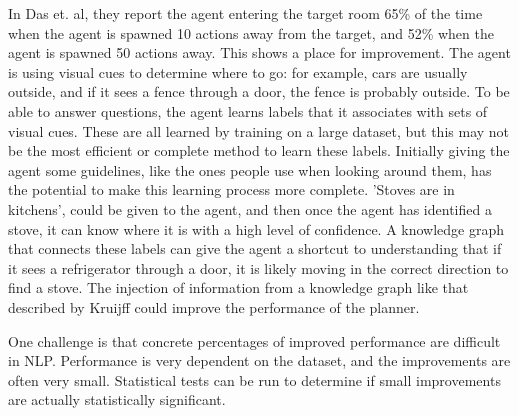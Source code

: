 \documentclass{article}
\begin{document}
In Das et. al, they report the agent entering the target room 65\% of the time when the agent is spawned 10 actions away from the target, and 52\% when the agent is spawned 50 actions away\cite{embodiedqa}. This shows a place for improvement. The agent is using visual cues to determine where to go: for example, cars are usually outside, and if it sees a fence through a door, the fence is probably outside. To be able to answer questions, the agent learns labels that it associates with sets of visual cues. These are all learned by training on a large dataset, but this may not be the most efficient or complete method to learn these labels. Initially giving the agent some guidelines, like the ones people use when looking around them, has the potential to make this learning process more complete. 'Stoves are in kitchens', could be given to the agent, and then once the agent has identified a stove, it can know where it is with a high level of confidence. A knowledge graph that connects these labels can give the agent a shortcut to understanding that if it sees a refrigerator through a door, it is likely moving in the correct direction to find a stove. The injection of information from a knowledge graph like that described by Kruijff could improve the performance of the planner\cite{Kruijff:2007}. 

One challenge is that concrete percentages of improved performance are difficult in NLP. Performance is very dependent on the dataset, and the improvements are often very small. Statistical tests can be run to determine if small improvements are actually statistically significant.
\end{document}
